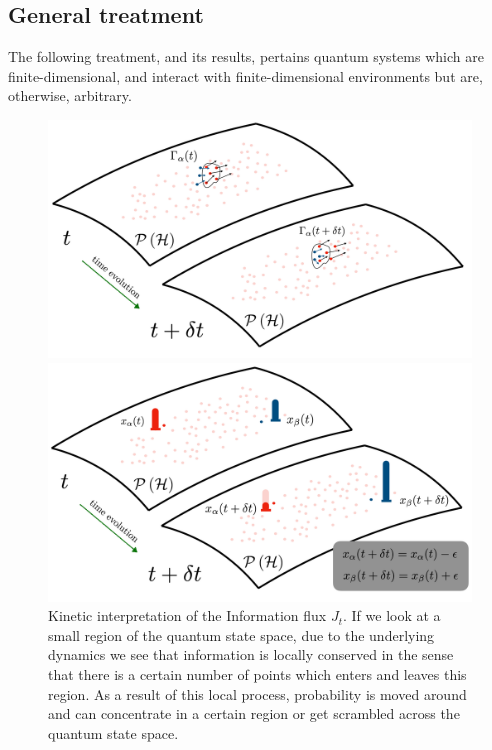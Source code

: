 \documentclass[draft,nofootinbib,pre,twocolumn,showpacs,showkeys,preprintnumbers,floatfix]{revtex4-1}
\newcommand{\1}{\mathbbm{1}}
\begin{document}
\subsection*{General treatment}
The following treatment, and its results, pertains quantum systems which are finite-dimensional, 
and interact with finite-dimensional environments but are, otherwise, arbitrary. 
\begin{figure}[t!]
\centering
\begin{minipage}[t]{.45\textwidth}
\includegraphics[width=\textwidth]{./img/Flux.pdf}
\caption{Kinetic interpretation of the Information flux $J_t$. If we look at a small region of the 
	quantum state space,  due to the underlying dynamics we see that information is locally conserved 
	in the sense that there is a certain number of points which enters and leaves this region. As a 
	result of this local process, probability is moved around and can concentrate in a certain region 
	or get scrambled across the quantum state space.
	}
\label{fig:flux_term}
\end{minipage}\hfill
\begin{minipage}[t]{.45\textwidth}
\includegraphics[width=\textwidth]{./img/Source.pdf}

\end{minipage}
\end{figure}
\end{document}
